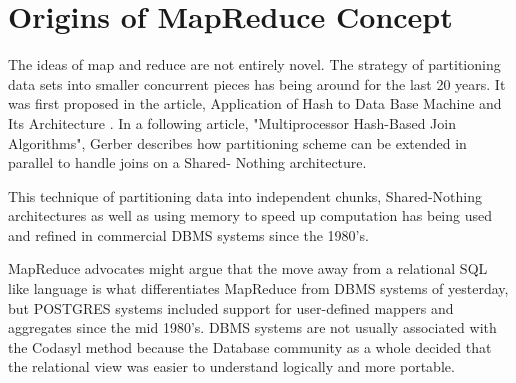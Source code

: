 \documentclass[10pt,twocolumn]{IEEEtran11}
\begin{document}
\section{Origins of MapReduce Concept}

The ideas of map and reduce are not entirely novel.  The strategy of partitioning  data sets into smaller concurrent pieces has being around for the last 20 years.  It was first proposed in the article, Application of Hash to Data Base Machine and Its Architecture \cite{kitsuregawa1983application}.   In a following article, "Multiprocessor Hash-Based Join Algorithms"\cite{dewitt1985multiprocessor}, Gerber describes how partitioning scheme can be extended in parallel to handle joins on a Shared- Nothing architecture. 
\par
This technique of partitioning data into independent chunks, Shared-Nothing architectures as well as using memory to speed up computation has being used and refined in commercial DBMS systems since the 1980's.
\par
MapReduce advocates might argue that the move away from a relational SQL like language is what differentiates MapReduce from DBMS systems of yesterday, but POSTGRES systems included support for user-defined  mappers and aggregates  since the mid 1980's.  DBMS systems are not usually associated with the Codasyl method because the Database community as a whole decided that the relational view was easier to understand logically and more portable.  









\end{document}
